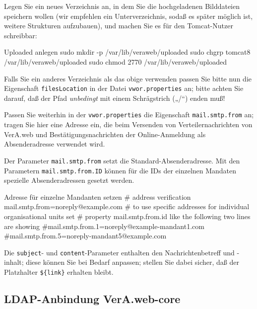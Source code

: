 \begin{minipage}{\linewidth}
Legen Sie ein neues Verzeichnis an, in dem Sie die hochgeladenen
Bilddateien speichern wollen (wir empfehlen ein Unterverzeichnis,
sodaß es später möglich ist, weitere Strukturen aufzubauen), und
machen Sie es für den Tomcat-Nutzer schreibbar:

\begin{lstdump}{Uploaded anlegen}
sudo mkdir -p /var/lib/veraweb/uploaded
sudo chgrp tomcat8 /var/lib/veraweb/uploaded
sudo chmod 2770 /var/lib/veraweb/uploaded
\end{lstdump}

Falls Sie ein anderes Verzeichnis als das obige verwenden passen
Sie bitte nun die Eigenschaft \texttt{filesLocation} in der Datei
\texttt{vwor.properties} an; bitte achten Sie darauf, daß der
Pfad \emph{unbedingt} mit einem Schrägstrich („/“) enden muß!
\end{minipage}

\begin{minipage}{\linewidth}
Passen Sie weiterhin in der \texttt{vwor.properties} die Eigenschaft
\texttt{mail.smtp.from} an; tragen Sie hier eine Adresse ein, die beim
Versenden von Verteilernachrichten von VerA.web und Bestätigungsnachrichten der Online-Anmeldung
als Absenderadresse verwendet wird.

Der Parameter \texttt{mail.smtp.from} setzt die Standard-Absenderadresse.
Mit den Parametern \texttt{mail.smtp.from.ID} können für die IDs der einzelnen
Mandaten spezielle Absenderadressen gesetzt werden.

\begin{lstdump}{Adresse für einzelne Mandanten setzen}
# address verification
mail.smtp.from=noreply@example.com
# to use specific addresses for individual organisational units set
# property mail.smtp.from.{id} like the following two lines are showing
#mail.smtp.from.1=noreply@example-mandant1.com
#mail.smtp.from.5=noreply-mandant5@example.com
\end{lstdump}

\ifoa

Die \texttt{subject}- und
\texttt{content}-Parameter enthalten den Nachrichtenbetreff und
-inhalt; diese können Sie bei Bedarf anpassen; stellen Sie dabei
sicher, daß der Platzhalter \texttt{\$\{link\}} erhalten bleibt.

\fi%

\end{minipage}

\subsection{LDAP-Anbindung VerA.web-core}\label{subsec:setup-core-ldap}

